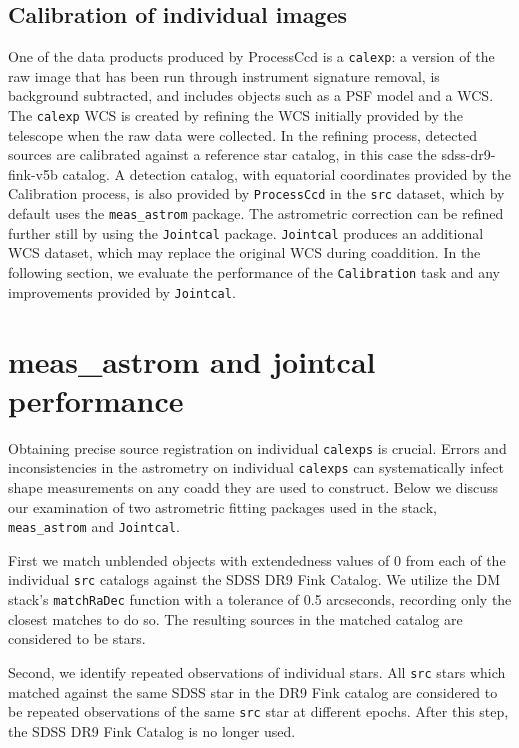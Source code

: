 \documentclass[DM,toc]{lsstdoc}
\begin{document}
\subsection{Calibration of individual images}
One of the data products produced by ProcessCcd is a {\tt\string calexp}: a version of the raw image that has been run through instrument signature removal, is background subtracted, and includes objects such as a PSF model and a WCS. The {\tt\string calexp} WCS is created by refining the WCS initially provided by the telescope when the raw data were collected. In the refining process, detected sources are calibrated against a reference star catalog, in this case the sdss-dr9-fink-v5b catalog. A detection catalog, with equatorial coordinates provided by the Calibration process, is also provided by {\tt\string ProcessCcd} in the {\tt\string src} dataset, which by default uses the {\tt\string meas\_astrom} package. The astrometric correction can be refined further still by using the {\tt\string Jointcal} package. {\tt\string Jointcal} produces an additional WCS dataset, which may replace the original WCS during coaddition. In the following section, we evaluate the performance of the {\tt\string Calibration} task and any improvements provided by {\tt\string Jointcal}.

\section{meas\_astrom and jointcal performance}
Obtaining precise source registration on individual {\tt\string calexps} is crucial. Errors and inconsistencies in the astrometry on individual {\tt\string calexps} can systematically infect shape measurements on any coadd they are used to construct. Below we discuss our examination of two astrometric fitting packages used in the stack, {\tt\string meas\_astrom} and {\tt\string Jointcal}.

First we match unblended objects with extendedness values of 0 from each of the individual {\tt\string src} catalogs against the SDSS DR9 Fink Catalog. We utilize the DM stack's {\tt\string matchRaDec} function with a tolerance of 0.5 arcseconds, recording only the closest matches to do so. The resulting sources in the matched catalog are considered to be stars.

Second, we identify repeated observations of individual stars. All {\tt\string src} stars which matched against the same SDSS star in the DR9 Fink catalog are considered to be repeated observations of the same {\tt\string src} star at different epochs. After this step, the SDSS DR9 Fink Catalog is no longer used.
\end{document}
